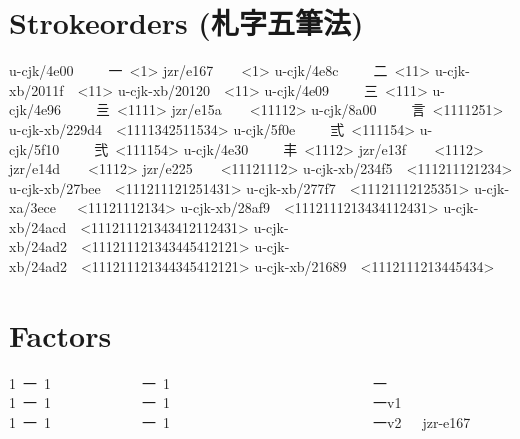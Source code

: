 \section{Strokeorders ({\cjk{}札字五筆法})
}
\begin{multicols}{2}\begingroup\mktsObeyAllLines{}

\begingroup\mktsStyleCode{}u-cjk/4e00     {\cjk{}一} <1>
jzr/e167   { }<1>
u-cjk/4e8c     {\cjk{}二} <11>
u-cjk-xb/2011f { }<11>
u-cjk-xb/20120 { }<11>
u-cjk/4e09     {\cjk{}三} <111>
u-cjk/4e96     {\cjk{}亖} <1111>
jzr/e15a   { }<11112>
u-cjk/8a00     {\cjk{}言} <1111251>
u-cjk-xb/229d4 { }<1111342511534>
u-cjk/5f0e     {\cjk{}弎} <111154>
u-cjk/5f10     {\cjk{}弐} <111154>
u-cjk/4e30     {\cjk{}丰} <1112>
jzr/e13f   { }<1112>
jzr/e14d   { }<1112>
jzr/e225   { }<11121112>
u-cjk-xb/234f5 { }<111211121234>
u-cjk-xb/27bee { }<111211121251431>
u-cjk-xb/277f7 { }<11121112125351>
u-cjk-xa/3ece  { }<11121112134>
u-cjk-xb/28af9 { }<1112111213434112431>
u-cjk-xb/24acd { }<111211121343412112431>
u-cjk-xb/24ad2 { }<111211121343445412121>
u-cjk-xb/24ad2 { }<111211121344345412121>
u-cjk-xb/21689 { }<1112111213445434>
\endgroup{}{}

\endgroup{}\end{multicols}\null\newpage{}\begin{multicols}{2}\end{multicols}
\section{Factors
}
\begin{multicols}{2}\end{multicols}\begingroup\mktsObeyAllLines{}

\begingroup\mktsStyleCode{}1 {\cjk{}一} 1             {\cjk{}一} 1                             {\cjk{}一} 
1 {\cjk{}一} 1             {\cjk{}一} 1                             {\cjk{}一}v1             {} 
1 {\cjk{}一} 1             {\cjk{}一} 1                             {\cjk{}一}v2   jzr-e167  {} 
 
